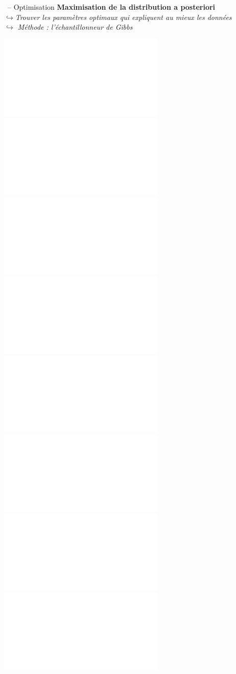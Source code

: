 \documentclass[10pt,xcolor=x11names,compress, show notes]{beamer}%
\begin{document}
\newlength{\wg} \setlength{\wg}{0.4\textwidth}
\begin{frame}{\insertsectionhead~-- Optimisation}
\textbf{Maximisation de la distribution a posteriori}\\
{\itshape $\hookrightarrow$Trouver les paramètres optimaux  qui expliquent au mieux les données\\
$\hookrightarrow$ Méthode : l'échantillonneur de Gibbs}
\vfill
\begin{overlayarea}{\textwidth}{0.5\textheight}
\centering
\includegraphics<1>[trim=-1.66cm 0 0 0, clip,height=\wg,angle=-90]{model2.pdf}
\includegraphics<2>[trim=-1.66cm 0 0 0, clip,height=\wg,angle=-90]{model0.pdf}
\includegraphics<3>[trim=-1.66cm 0 0 0, clip,height=\wg,angle=-90]{model3.pdf}
\includegraphics<4>[trim=-1.66cm 0 0 0, clip,height=\wg,angle=-90]{model4.pdf}
\includegraphics<5>[trim=-1.66cm 0 0 0, clip,height=\wg,angle=-90]{model5.pdf}
\includegraphics<6>[trim=-1.66cm 0 0 0, clip,height=\wg,angle=-90]{model6.pdf}
\includegraphics<7>[trim=-1.66cm 0 0 0, clip,height=\wg,angle=-90]{model7.pdf}
\includegraphics<8->[height=\wg+0.002\textwidth,angle=-90]{model8.pdf}
\end{overlayarea}
\vfill
{}
\end{frame}
\end{document}
